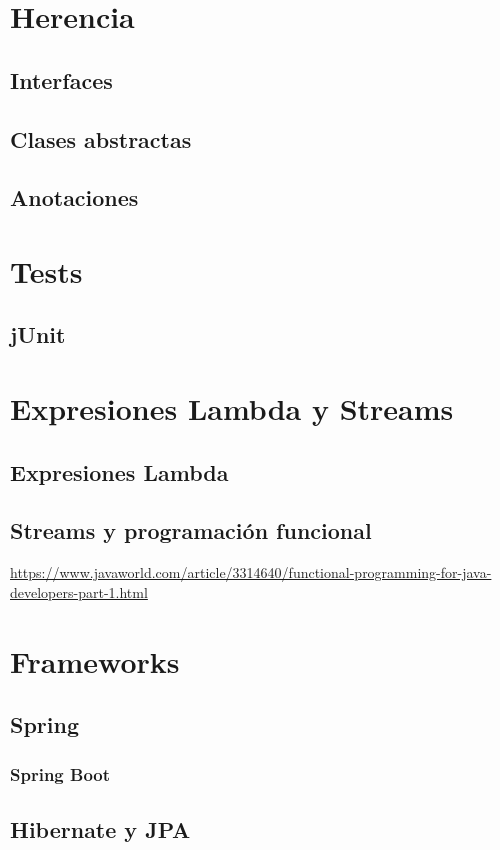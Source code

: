 \documentclass[11pt]{article}
\begin{document}
\section{Herencia}
\label{sec:orgaedaea0}
\subsection{Interfaces}
\label{sec:org78fdbbb}
\subsection{Clases abstractas}
\label{sec:org8ffda15}
\subsection{Anotaciones}
\label{sec:orgf324057}
\section{Tests}
\label{sec:org0d07fa7}
\subsection{jUnit}
\label{sec:org6caaaae}
\section{Expresiones Lambda y Streams}
\label{sec:org255e017}
\subsection{Expresiones Lambda}
\label{sec:orgfdf19ba}
\subsection{Streams y programación funcional}
\label{sec:org2a2438f}
\url{https://www.javaworld.com/article/3314640/functional-programming-for-java-developers-part-1.html}
\section{Frameworks}
\label{sec:orgefb8534}
\subsection{Spring}
\label{sec:orge4a06fb}
\subsubsection{Spring Boot}
\label{sec:org981e0d6}
\subsection{Hibernate y JPA}
\label{sec:org6a4ed35}
\end{document}
